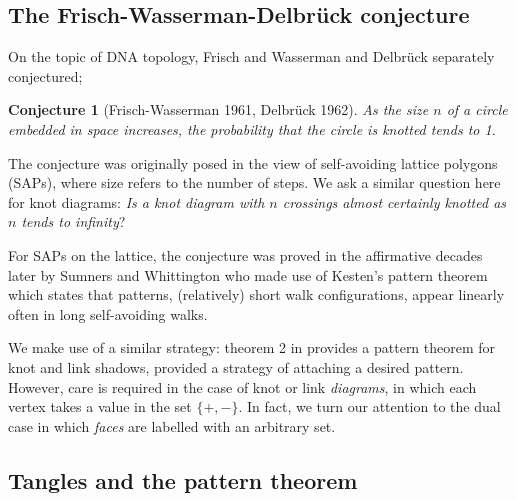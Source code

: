 \documentclass[amsmath,longbibliography,secnumarabic,floatfix,amssymb,nofootinbib,nobibnotes,letterpaper,11pt,tightenlines,notitlepage,showkeys,showlabels]{amsart}%
\newtheorem*{conjecture}{Conjecture}
\theoremstyle{definition}
\begin{document}
\subsection{The Frisch-Wasserman-Delbr\"uck conjecture}
\label{sec:fwdconj}

\newcommand{\MapClass}{\mathscr{M}}

On the topic of DNA topology, Frisch and Wasserman\cite{Frisch_1961}
and Delbr\"uck\cite{delbruck1962ams} separately conjectured;

\begin{conjecture}[Frisch-Wasserman 1961, Delbr\"uck 1962]
  As the size $n$ of a circle embedded in space increases, the
  probability that the circle is knotted tends to 1.
\end{conjecture}

The conjecture was originally posed in the view of self-avoiding
lattice polygons (SAPs), where size refers to the number of steps.
We ask a similar question here for knot
diagrams: \emph{Is a knot diagram with $n$ crossings almost certainly
  knotted as $n$ tends to infinity}?

For SAPs on the lattice, the conjecture was proved in the
affirmative decades later by Sumners and
Whittington\cite{Sumners_1988} who made use of Kesten's pattern
theorem\cite{Kesten_1964,Kesten_1963} which states that patterns,
(relatively) short walk configurations, appear linearly often in long
self-avoiding walks.

We make use of a similar strategy: theorem 2 in \cite{Bender1992104}
provides a pattern theorem for knot and link shadows, provided a
strategy of attaching a desired pattern. However, care is required in
the case of knot or link \emph{diagrams}, in which each vertex takes a
value in the set $\{+, -\}$. In fact, we turn our attention to the
dual case in which \emph{faces} are labelled with an arbitrary set.

\subsection{Tangles and the pattern theorem}
\label{sec:patternthm}
\end{document}
